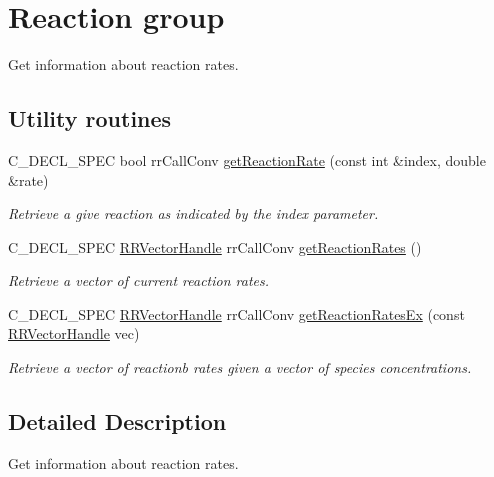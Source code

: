 \hypertarget{group__reaction}{
\section{\-Reaction group}
\label{group__reaction}
}


\-Get information about reaction rates.  


\subsection*{\-Utility routines}
\begin{DoxyCompactItemize}
\item 
\-C\-\_\-\-D\-E\-C\-L\-\_\-\-S\-P\-E\-C bool rr\-Call\-Conv \hyperlink{group__utility_gaa2ec2c989a20e15b0fb5cb45b3af2837}{get\-Reaction\-Rate} (const int \&index, double \&rate)
\begin{DoxyCompactList}\small\item\em \-Retrieve a give reaction as indicated by the index parameter. \end{DoxyCompactList}\item 
\-C\-\_\-\-D\-E\-C\-L\-\_\-\-S\-P\-E\-C \hyperlink{rr__c__types_8h_aea46a16752b0ae2cd95c009030ee630e}{\-R\-R\-Vector\-Handle} \*
rr\-Call\-Conv \hyperlink{group__utility_ga86d544bcf3eeaa4698a60123a3da69aa}{get\-Reaction\-Rates} ()
\begin{DoxyCompactList}\small\item\em \-Retrieve a vector of current reaction rates. \end{DoxyCompactList}\item 
\-C\-\_\-\-D\-E\-C\-L\-\_\-\-S\-P\-E\-C \hyperlink{rr__c__types_8h_aea46a16752b0ae2cd95c009030ee630e}{\-R\-R\-Vector\-Handle} \*
rr\-Call\-Conv \hyperlink{group__utility_gaa03d9414ddeb177a76365dd5b2d0042e}{get\-Reaction\-Rates\-Ex} (const \hyperlink{rr__c__types_8h_aea46a16752b0ae2cd95c009030ee630e}{\-R\-R\-Vector\-Handle} vec)
\begin{DoxyCompactList}\small\item\em \-Retrieve a vector of reactionb rates given a vector of species concentrations. \end{DoxyCompactList}\end{DoxyCompactItemize}


\subsection{\-Detailed \-Description}
\-Get information about reaction rates. 

